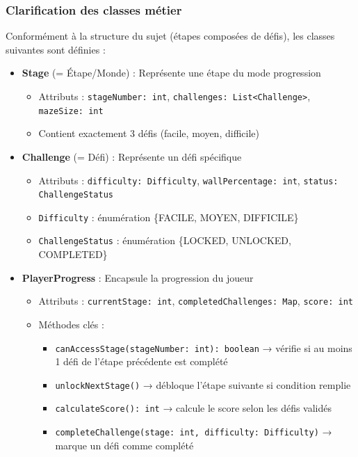 \documentclass{butexFR}
\begin{document}
\subsubsection{Clarification des classes métier}

Conformément à la structure du sujet (étapes composées de défis), les classes suivantes sont définies :

\begin{itemize}
    \item \textbf{Stage} (= Étape/Monde) : Représente une étape du mode progression
    \begin{itemize}
        \item Attributs : \texttt{stageNumber: int}, \texttt{challenges: List<Challenge>}, \texttt{mazeSize: int}
        \item Contient exactement 3 défis (facile, moyen, difficile)
    \end{itemize}

    \item \textbf{Challenge} (= Défi) : Représente un défi spécifique
    \begin{itemize}
        \item Attributs : \texttt{difficulty: Difficulty}, \texttt{wallPercentage: int}, \texttt{status: ChallengeStatus}
        \item \texttt{Difficulty} : énumération \{FACILE, MOYEN, DIFFICILE\}
        \item \texttt{ChallengeStatus} : énumération \{LOCKED, UNLOCKED, COMPLETED\}
    \end{itemize}

    \item \textbf{PlayerProgress} : Encapsule la progression du joueur
    \begin{itemize}
        \item Attributs : \texttt{currentStage: int}, \texttt{completedChallenges: Map}, \texttt{score: int}
        \item Méthodes clés :
        \begin{itemize}
            \item \texttt{canAccessStage(stageNumber: int): boolean} → vérifie si au moins 1 défi de l'étape précédente est complété
            \item \texttt{unlockNextStage()} → débloque l'étape suivante si condition remplie
            \item \texttt{calculateScore(): int} → calcule le score selon les défis validés
            \item \texttt{completeChallenge(stage: int, difficulty: Difficulty)} → marque un défi comme complété
        \end{itemize}
    \end{itemize}


\end{itemize}
\end{document}
